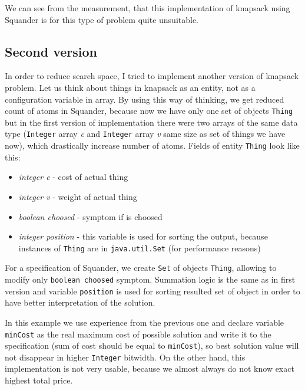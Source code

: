 \documentclass[11pt,twoside,a4paper]{book}
\begin{document}
We can see from the measurement, that this implementation of knapsack
using Squander is for this type of problem quite unsuitable.

\subsection{Second version}

In order to reduce search space, I tried to implement another version of
knapsack problem. Let us think about things in knapsack as an entity, not as a
configuration variable in array. By using this way of thinking, we get reduced
count of atoms in Squander, because now we have only one set of objects \verb|Thing| but in the
first version of implementation there were two arrays of the same data type
(\verb|Integer| array \textit{c} and \verb|Integer| array \textit{v} same size
as set of things we have now), which drastically increase number of atoms.
Fields of entity \verb|Thing| look like this:

\begin{itemize}
  \item \textit{integer c} - cost of actual thing
  \item \textit{integer v} - weight of actual thing
  \item \textit{boolean choosed} - symptom if is choosed
  \item \textit{integer position} - this variable is used for sorting the
  output, because instances of \verb|Thing| are in \verb|java.util.Set|
  (for performance reasons)
\end{itemize}

For a specification of Squander, we create \verb|Set| of objects \verb|Thing|,
allowing to modify only \verb|boolean choosed| symptom. Summation logic is the
same as in first version and variable \verb|position| is used for sorting
resulted set of object in order to have better interpretation of the solution.

In this example we use experience from the previous one and declare variable
\verb|minCost| as the real maximum cost of possible solution and write it to the
specification (sum of cost should be equal to \verb|minCost|), so best
solution value will not disappear in higher \verb|Integer| bitwidth. On the
other hand, this implementation is not very usable, because we almost always do
not know exact highest total price.


\end{document}
